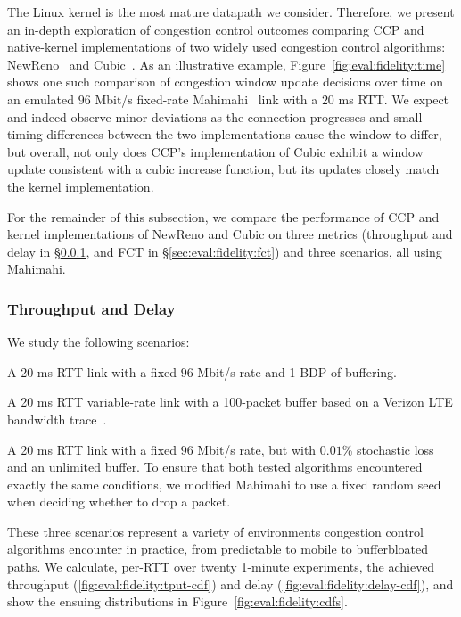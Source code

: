 The Linux kernel is the most mature datapath we consider. Therefore, we present an in-depth exploration of congestion control outcomes comparing CCP and native-kernel implementations of two widely used congestion control algorithms: NewReno~\cite{newreno} and Cubic~\cite{cubic}.
As an illustrative example, Figure~\ref{fig:eval:fidelity:time} shows one such comparison of congestion window update decisions over time on an emulated $96$ Mbit/s fixed-rate Mahimahi~\cite{mahimahi} link with a $20$ ms RTT.
We expect and indeed observe minor deviations as the connection progresses and small timing differences between the two implementations cause the window to differ, but overall,
not only does CCP's implementation of Cubic exhibit a window update consistent with a cubic increase function, but its updates closely match the kernel implementation.

For the remainder of this subsection, we compare the performance of CCP and kernel implementations of NewReno and Cubic on three metrics (throughput and delay in \S\ref{sec:eval:fidelity:tput-delay}, and FCT in \S\ref{sec:eval:fidelity:fct}) and three scenarios, all using Mahimahi.

\subsubsection{Throughput and Delay}
\label{sec:eval:fidelity:tput-delay}

We study the following scenarios:

 A 20 ms RTT link with a fixed $96$ Mbit/s rate and 1 BDP of buffering.

 A 20 ms RTT variable-rate link with a 100-packet buffer based on a Verizon LTE bandwidth trace~\cite{mahimahi}.

 A 20 ms RTT link with a fixed $96$ Mbit/s rate, but with $0.01$\% stochastic loss and an unlimited buffer. To ensure that both tested algorithms encountered exactly the same conditions, we modified Mahimahi to use a fixed random seed when deciding whether to drop a packet.

These three scenarios represent a variety of environments congestion control algorithms encounter in practice, from predictable to mobile to bufferbloated paths. We calculate, per-RTT over twenty 1-minute experiments, the achieved throughput (\ref{fig:eval:fidelity:tput-cdf}) and delay (\ref{fig:eval:fidelity:delay-cdf}), and show the ensuing distributions in Figure~\ref{fig:eval:fidelity:cdfs}.

